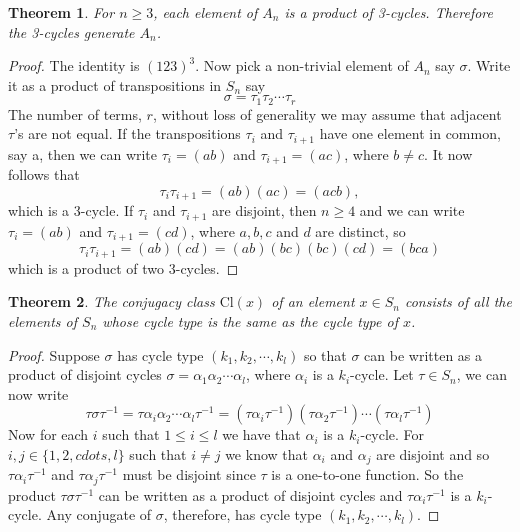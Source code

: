 \documentclass[a4paper,10pt]{article}
\newtheorem{theorem}{Theorem}
\begin{document}
\begin{theorem}
For $n\geq 3$, each element of $A_n$ is a product of 3-cycles. Therefore the 3-cycles generate $A_n$.
\end{theorem}
\begin{proof}
The identity is $(123)^3$. Now pick a non-trivial element of $A_n$ say $\sigma$. Write it as a product of transpositions in $S_n$ say
\begin{equation}
\sigma = \tau_1\tau_2 \cdots \tau_r 
\end{equation}
The number of terms, $r$, without loss of generality we may assume that adjacent $\tau$'s are not equal. If the transpositions $\tau_i$ and $\tau_{i+1}$ have one element in common, say a, then we can write $\tau_i = (ab)$ and $\tau_{i+1}=(ac)$, where $b\neq c$. It now follows that
\begin{equation}
\tau_i\tau_{i+1} = (ab)(ac) = (acb), 
\end{equation}
which is a 3-cycle. If $\tau_i$ and $\tau_{i+1}$ are disjoint, then $n\geq 4$ and we can write $\tau_i = (ab)$ and $\tau_{i+1} = (cd)$, where $a,b,c$ and $d$ are distinct, so 
\begin{equation}
\tau_i\tau_{i+1}=(ab)(cd)=(ab)(bc)(bc)(cd)=(bca)%
\end{equation}
which is a product of two 3-cycles.



\end{proof}

\begin{theorem}
The conjugacy class $\textrm{Cl}(x)$ of an element $x \in S_n$ consists of all the elements of $S_n$ whose cycle type is the same as the cycle type of $x$.  
\end{theorem}

\begin{proof}
Suppose $\sigma$ has cycle type $(k_1,k_2,\cdots,k_l)$ so that $\sigma$ can be written as a product of disjoint cycles $\sigma = \alpha_1\alpha_2\cdots \alpha_l$, where $\alpha_i$ is a $k_i$-cycle. Let $\tau\in S_n$, we can now write
\begin{equation}
\tau \sigma \tau^{-1} = \tau \alpha_i\alpha_2\cdots\alpha_l\tau^{-1}=(\tau \alpha_i\tau^{-1})(\tau\alpha_2\tau^{-1})\cdots(\tau\alpha_l\tau^{-1}) 
\end{equation}
Now for each $i$ such that $1\leq i\leq l$ we have that $\alpha_i$ is a $k_i$-cycle. For $i,j\in\{1,2,cdots,l\}$
such that $i\neq j$ we know that $\alpha_i$ and $\alpha_j$ are disjoint and so $\tau\alpha_i\tau^{-1}$ and $\tau\alpha_j\tau^{-1}$ must be disjoint since $\tau$ is a one-to-one function. So the product $\tau\sigma\tau^{-1}$ can be written as a product of disjoint cycles and $\tau\alpha_i\tau^{-1}$ is a $k_i$-cycle. Any conjugate of $\sigma$, therefore, has cycle type $(k_1,k_2,\cdots,k_l)$.  
\end{proof}
\end{document}
